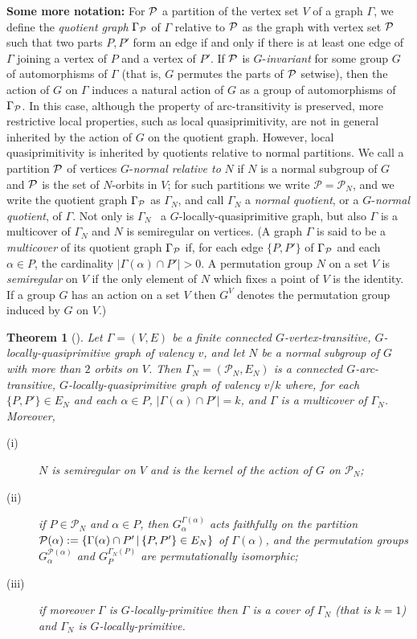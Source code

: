 \documentclass[12pt, a4paper]{article}
\newtheorem{theorem}{Theorem}[section]
\def\Ga{\Gamma}
\def\G{\Gamma}
\def\a{\alpha}
\begin{document}
\medskip
\noindent\textbf{Some more notation:}\quad
For ${\cal P}$ a partition of the vertex set $V$ of a graph $\Gamma$,
we define the {\em quotient graph} $\Gamma_{\cal P}$ of $\Gamma$ relative to
${\cal P}$ as the graph with vertex set ${\cal P}$ such that two
parts $P,P'$ form an edge if and only if there is at least one edge
of $\Gamma$ joining a vertex of $P$ and a vertex of $P'$. If ${\cal P}$
is $G$-{\em invariant} for some group $G$ of automorphisms of $\Gamma$
(that is, $G$ permutes the parts of ${\cal P}$ setwise), then the
action of $G$ on $\Gamma$ induces a natural action of $G$ as 
a group of automorphisms of
$\Gamma_{\cal P}$. In this case, although the property of
arc-transitivity is preserved, more restrictive local properties, such
as local quasiprimitivity, are not in general inherited by the action of
$G$ on the quotient graph. However, local quasiprimitivity is inherited
by quotients relative to normal partitions. We call a partition
${\cal P}$ of vertices $G$-{\em normal relative to} $N$ if
$N$ is a normal subgroup of $G$ and ${\cal P}$ is the set of $N$-orbits
in $V$; for such partitions we write $\mathcal{P}=\mathcal{P}_N$, 
and we write the quotient graph $\Gamma_{\cal P}$ as $\Gamma_N$, 
and call $\Gamma_N$ a {\em normal quotient}, or a $G$-{\em normal quotient}, of $\Gamma$. 
Not only is $\Gamma_N$ \, a $G$-locally-quasiprimitive graph, but also $\Gamma$ is 
a multicover of $\Gamma_N$ and $N$ is semiregular on 
vertices. (A graph $\G$ is said to be a {\em multicover} of its quotient 
graph $\Gamma_{\cal P}$ if, for each edge $\{ P,P'\}$ of $\Gamma_{\cal P}$
and each $\alpha \in P$, the cardinality $|\Gamma(\alpha) \cap P'| >0$.
A permutation group $N$ on a set $V$ is \emph{semiregular} on $V$ if
the only element of $N$ which fixes a point of $V$ is the identity.
If a group $G$ has an action on a set $V$ then $G^V$ denotes the 
permutation group induced by $G$ on $V$.)

 
\begin{theorem}[{\cite[Section~1]{cep:p1}}]
\label{thm:normal}
Let $\G=(V,E)$ be a finite connected $G$-vertex-transit\-ive, 
$G$-locally-quasiprimitive graph of valency
$v$, and let $N$ be a normal 
subgroup of $G$ with more than $2$ orbits on $V$. Then 
 $\Ga_N=(\mathcal{P}_N,E_N)$ 
is a connected $G$-arc-transitive, $G$-locally-quasiprimitive graph of 
valency $v/k$ where, 
for each $\{P,P'\}\in E_N$ and each $\a\in P$, $|\Ga(\a)\cap P'|=k$, 
and $\Ga$ is a multicover of $\Ga_N$. Moreover,
\begin{description}
\item [(i)]$N$ is semiregular on $V$ and is the kernel 
of the action of $G$ on $\mathcal{P}_N$;  
\item[(ii)]if $P\in\mathcal{P}_N$  and $\a\in  P$, then
$G_{\a}^{\Ga(\a)}$ acts faithfully on the partition ${\cal P}(\a)
:=\{\Ga(\a)\cap P'\, |\, \{ P,P'\}\in E_N\}$ of $\Ga(\a)$, and the 
permutation groups $G_{\a}^{\mathcal{P}(\a)}$ and 
$G_P^{\Ga_N(P)}$ are permutationally
isomorphic;
\item [(iii)] if moreover $\Ga$ is $G$-locally-primitive
then $\Ga$ is a cover of $\Ga_N$ (that is $k=1$) and $\Ga_N$ 
is $G$-locally-primitive.
\end{description}
\end{theorem}
\end{document}
